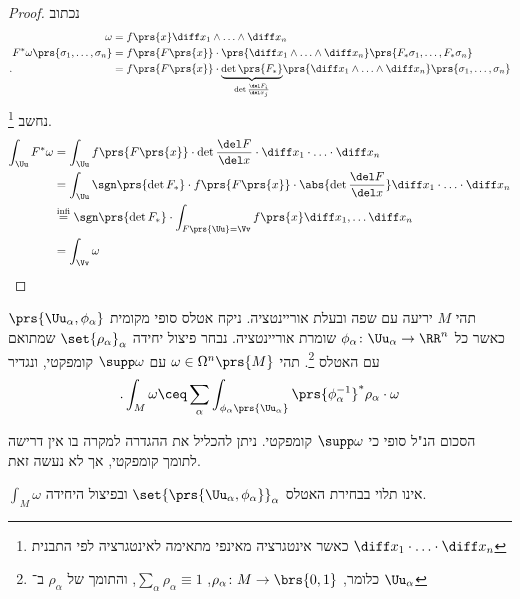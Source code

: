 \documentclass[a4paper,10pt,twoside,openany]{book}
\begin{document}
\begin{proof}
נכתוב
\begin{align*}
\omega &= f\prs{x} \diff x_1 \wedge \ldots \wedge \diff x_n \\
F^* \omega\prs{\sigma_1, \ldots, \sigma_n} &= f\prs{F\prs{x}} \cdot \prs{\diff x_1 \wedge \ldots \wedge \diff x_n} \prs{F_* \sigma_1, \ldots, F_* \sigma_n} \\ \text{.} \phantom{F^* \omega\prs{\sigma_1, \ldots, \sigma_n}} &=
f\prs{F\prs{x}} \cdot \underset{\det \frac{\del F_i}{\del x_j}}{\underbrace{\det \prs{F_*}}} \prs{\diff x_1 \wedge \ldots \wedge \diff x_n}\prs{\sigma_1, \ldots, \sigma_n}
\end{align*}
נחשב%
\footnote{כאשר אינטגרציה מאינפי מתאימה לאינטגרציה לפי התבנית
$\diff x_1 \cdot \ldots \cdot \diff x_n$}.
\begin{align*}
\int_{\Uu}F^* \omega &= \int_{\Uu} f\prs{F\prs{x}} \cdot \det \frac{\del F}{\del x} \cdot \diff x_1 \cdot \ldots \cdot \diff x_n \\& = \int_{\Uu} \sgn\prs{\det F_*} \cdot f\prs{F\prs{x}} \cdot \abs{\det \frac{\del F}{\del x}} \diff x_1 \cdot \ldots \cdot \diff x_n \\&\stackrel{\text{infi}}{=}
\sgn\prs{\det F_*} \cdot \int_{F\prs{\Uu} = \Vv} f\prs{x} \diff x_1, \ldots \diff x_n \\ &= \int_{\Vv} \omega
\end{align*}
\end{proof}

\begin{definition}
תהי
$M$
יריעה עם שפה ובעלת אוריינטציה.
ניקח אטלס סופי מקומית
$\prs{\Uu_{\alpha},\phi_{\alpha}}$
כאשר כל
$\phi_{\alpha} \colon \Uu_{\alpha} \to \RR^n$
שומרת אוריינטציה.
נבחר פיצול יחידה
$\set{\rho_{\alpha}}_{\alpha}$
שמתואם עם האטלס%
\footnote{כלומר,
$\rho_{\alpha} \colon M \to \brs{0,1}$,
$\sum_{\alpha} \rho_{\alpha} \equiv 1$,
והתומך של
$\rho_{\alpha}$
ב־
$\Uu_{\alpha}$}.
תהי
$\omega \in \Omega^n\prs{M}$
עם
$\supp\omega$
קומפקטי, ונגדיר
\[\text{.} \int_M \omega \ceq \sum_{\alpha} \int_{\phi_{\alpha}\prs{\Uu_{\alpha}}} \prs{\phi_{\alpha}^{-1}}^* \rho_{\alpha} \cdot \omega\]
\end{definition}
\begin{remark}
הסכום הנ"ל סופי כי
$\supp\omega$
קומפקטי.
ניתן להכליל את ההגדרה למקרה בו אין דרישה לתומך קומפקטי, אך לא נעשה זאת.
\end{remark}

\begin{proposition}
$\int_M \omega$
אינו תלוי בבחירת האטלס
$\set{\prs{\Uu_{\alpha},\phi_{\alpha}}}_{\alpha}$
ובפיצול היחידה.
\end{proposition}
\end{document}
